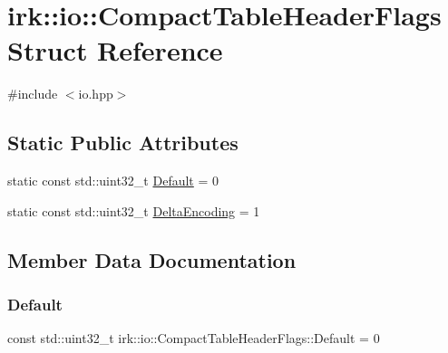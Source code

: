 \hypertarget{structirk_1_1io_1_1CompactTableHeaderFlags}{}\section{irk\+:\+:io\+:\+:Compact\+Table\+Header\+Flags Struct Reference}
\label{structirk_1_1io_1_1CompactTableHeaderFlags}


{\ttfamily \#include $<$io.\+hpp$>$}

\subsection*{Static Public Attributes}
\begin{DoxyCompactItemize}
\item 
static const std\+::uint32\+\_\+t \mbox{\hyperlink{structirk_1_1io_1_1CompactTableHeaderFlags_aba694dc8cc99ef6b087c102f484ea852}{Default}} = 0
\item 
static const std\+::uint32\+\_\+t \mbox{\hyperlink{structirk_1_1io_1_1CompactTableHeaderFlags_a9314ed0b12bb5dd4bef4eff97ea35b5c}{Delta\+Encoding}} = 1
\end{DoxyCompactItemize}


\subsection{Member Data Documentation}
\mbox{\label{structirk_1_1io_1_1CompactTableHeaderFlags_aba694dc8cc99ef6b087c102f484ea852}} 
\subsubsection{\texorpdfstring{Default}{Default}}
{\footnotesize\ttfamily const std\+::uint32\+\_\+t irk\+::io\+::\+Compact\+Table\+Header\+Flags\+::\+Default = 0\hspace{0.3cm}{\ttfamily [static]}}

\mbox{\label{structirk_1_1io_1_1CompactTableHeaderFlags_a9314ed0b12bb5dd4bef4eff97ea35b5c}} 
